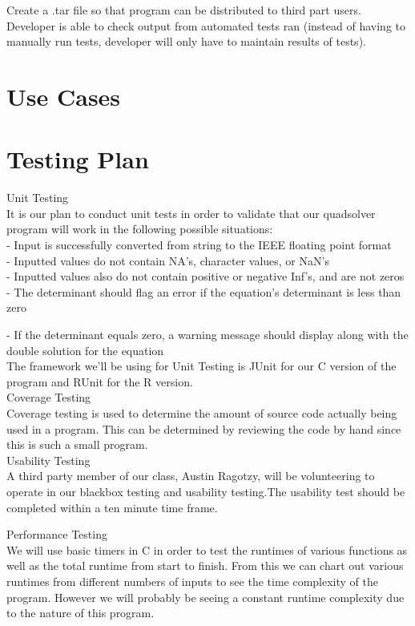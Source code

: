 \documentclass[notitlepage,a4paper,12pt]{article}
\begin{document}
Create a .tar file so that program can be distributed to third part users. \\

Developer is able to check output from automated tests ran (instead of having to manually run tests, developer will only have to maintain results of tests). \\

\section*{Use Cases}

\section*{Testing Plan}
Unit Testing \\

It is our plan to conduct unit tests in order to validate that our quadsolver program will work in the following possible situations: \\

 - Input is successfully converted from string to the IEEE floating point format \\
 
 - Inputted values do not contain NA's, character values, or NaN's \\
 
 - Inputted values also do not contain positive or negative Inf's, and are not zeros \\
 
 - The determinant should flag an error if the equation's determinant is less than zero
 
 - If the determinant equals zero, a warning message should display along with the double solution for the equation\\
 
The framework we'll be using for Unit Testing is JUnit for our C version of the program and RUnit for the R version. \\
 
Coverage Testing \\

Coverage testing is used to determine the amount of source code actually being used in a program. This can be determined by reviewing the code by hand since this is such a small program. \\

Usability Testing \\

A third party member of our class, Austin Ragotzy, will be volunteering to operate in our blackbox testing and usability testing.The usability test should be completed within a ten minute time frame. 

Performance Testing\\
We will use basic timers in C in order to test the runtimes of various functions as well as the total runtime from start to finish. From this we can chart out various runtimes from different numbers of inputs to see the time complexity of the program. However we will probably be seeing a constant runtime complexity due to the nature of this program.
\end{document}
